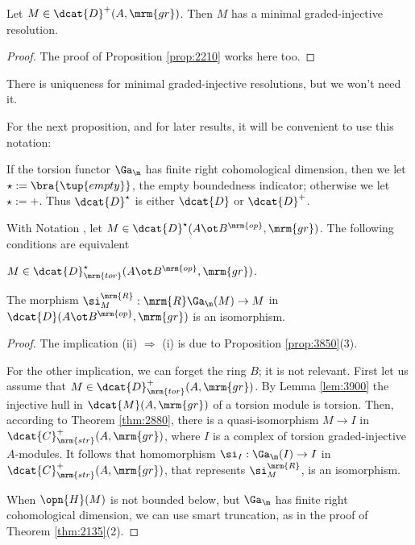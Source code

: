 \begin{lem} \label{lem:3837}
Let $M \in \dcat{D}^+(A, \mrm{gr})$. Then $M$ has a minimal 
graded-injective resolution.
\end{lem}

\begin{proof}
The proof of Proposition \ref{prop:2210} works here too. 
\end{proof}

There is uniqueness for minimal graded-injective resolutions, but we won't need 
it. 

For the next proposition, and for later results, it will be convenient to use 
this notation:

\begin{notation} \label{not:3965}
If the torsion functor $\Ga_{\m}$ has finite right cohomological dimension, 
then we let $\star := \bra{\tup{empty}}$, the empty boundedness indicator; 
otherwise we let $\star := +$. Thus $\dcat{D}^{\star}$ is either 
$\dcat{D}$ or $\dcat{D}^+$.
\end{notation}

\begin{prop} \label{prop:3965}
With Notation \tup{\ref{not:3965}}, let 
$M \in \dcat{D}^{\star}(A \ot B^{\mrm{op}}, \mrm{gr})$. The following 
conditions are equivalent\tup{:}
\begin{enumerate}
 $M \in \dcat{D}^{\star}_{\mrm{tor}}(A \ot B^{\mrm{op}}, \mrm{gr})$.

 The morphism 
$\si^{\mrm{R}}_{M} : \mrm{R} \Ga_{\m}(M) \to M$
in $\dcat{D}(A \ot B^{\mrm{op}}, \mrm{gr})$
is an isomorphism.
\end{enumerate}
\end{prop}

\begin{proof}
The implication (ii) $\Rightarrow$ (i) is due to Proposition 
\ref{prop:3850}(3).  

For the other implication, we can forget the ring $B$; it is not relevant. 
First let us assume that 
$M \in \dcat{D}^{+}_{\mrm{tor}}(A, \mrm{gr})$.
By Lemma \ref{lem:3900} the injective hull in $\dcat{M}(A, \mrm{gr})$ of 
a torsion module is torsion. 
Then, according to Theorem \ref{thm:2880}, there is a quasi-isomorphism 
$M \to I$ in $\dcat{C}^+_{\mrm{str}}(A, \mrm{gr})$,
where $I$ is a complex of torsion graded-injective $A$-modules.
It follows that homomorphism 
$\si_I : \Ga_{\m}(I) \to I$
in $\dcat{C}^+_{\mrm{str}}(A, \mrm{gr})$, that represents $\si^{\mrm{R}}_{M}$,
is an isomorphism. 

When $\opn{H}(M)$ is not bounded below, but $\Ga_{\m}$ has finite right 
cohomological dimension, we can use smart truncation, as in the proof of 
Theorem \ref{thm:2135}(2).
\end{proof}

